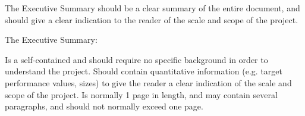 The Executive Summary should be a clear summary of the entire document, and should give a clear indication to the reader of the scale and scope of the project.

 

The Executive Summary:

    Is a self-contained and should require no specific background in order to understand the project.
    Should contain quantitative information  (e.g. target performance values, sizes) to give the reader a clear indication of the scale and scope of the project.
    Is normally 1 page in length, and may contain several paragraphs, and should not normally exceed one page.
